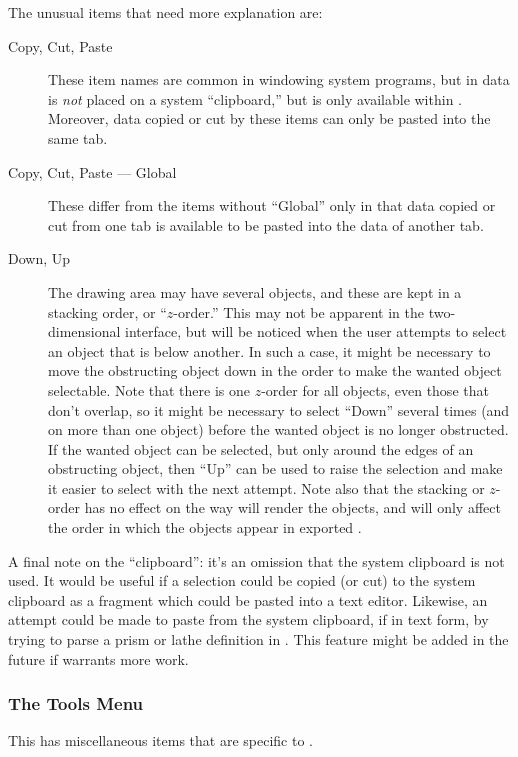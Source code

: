 			The unusual items that need more explanation are:
			\begin{description}
			  \item[Copy, Cut, Paste] These item names are common
			  in windowing system programs, but in \IXpkg{} data
			  is \emph{not} placed on a system ``clipboard,'' but
			  is only available within \IXpkg. Moreover, data
			  copied or cut by these items can only be pasted into
			  the same tab.
			  \item[Copy, Cut, Paste --- Global] These differ from
			  the items without ``Global'' only in that data
			  copied or cut from one tab is available to be pasted
			  into the data of another tab.
			  \item[Down, Up] The drawing area may have several
			  objects, and these are kept in a stacking order, or
			  ``$z$-order.'' This may not be apparent in the
			  two-dimensional interface, but will be noticed when
			  the user attempts to select an object that is below
			  another. In such a case, it might be necessary
			  to move the obstructing object down in the order
			  to make the wanted object selectable. Note that
			  there is one $z$-order for all objects, even
			  those that don't overlap, so it might be necessary
			  to select ``Down'' several times (and on more
			  than one object) before the wanted
			  object is no longer obstructed. If the wanted object
			  can be selected, but only around the edges of an
			  obstructing object, then ``Up'' can be used to
			  raise the selection and make it easier to select
			  with the next attempt. Note also that the
			  stacking or $z$-order has no effect on the way
			  \IXpov{} will render the objects, and will only affect
			  the order in which the objects appear in exported
			  .
			\end{description}
			
			A final note on the ``clipboard'': it's an omission
			that the system clipboard is not used. It would be
			useful if a selection could be copied (or cut) to
			the system clipboard as a  fragment
			which could be pasted into a text editor. Likewise,
			an attempt could be made to paste from the system
			clipboard, if in text form, by trying to parse a
			prism or lathe definition in . This
			feature might be added in the future if \IXpkg{}
			warrants more work.

			\subsubsection{The Tools Menu}%
			This  has miscellaneous items that
			are specific to \IXpkg.

